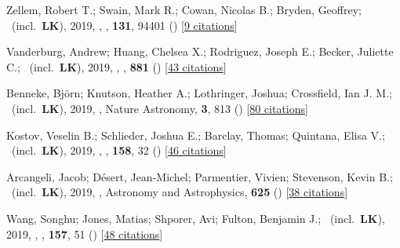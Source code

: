 \item[{\color{numcolor}\scriptsize31}] Zellem, Robert T.; Swain, Mark R.; Cowan, Nicolas B.; Bryden, Geoffrey; \etal\ (incl.\ \textbf{LK}), 2019, , \pasp, \textbf{131}, 94401 () [\href{https://ui.adsabs.harvard.edu/abs/2019PASP..131i4401Z}{9 citations}]

\item[{\color{numcolor}\scriptsize30}] Vanderburg, Andrew; Huang, Chelsea X.; Rodriguez, Joseph E.; Becker, Juliette C.; \etal\ (incl.\ \textbf{LK}), 2019, , \apj, \textbf{881} () [\href{https://ui.adsabs.harvard.edu/abs/2019ApJ...881L..19V}{43 citations}]

\item[{\color{numcolor}\scriptsize29}] Benneke, Bj{\"o}rn; Knutson, Heather A.; Lothringer, Joshua; Crossfield, Ian J. M.; \etal\ (incl.\ \textbf{LK}), 2019, , Nature Astronomy, \textbf{3}, 813 () [\href{https://ui.adsabs.harvard.edu/abs/2019NatAs...3..813B}{80 citations}]

\item[{\color{numcolor}\scriptsize28}] Kostov, Veselin B.; Schlieder, Joshua E.; Barclay, Thomas; Quintana, Elisa V.; \etal\ (incl.\ \textbf{LK}), 2019, , \aj, \textbf{158}, 32 () [\href{https://ui.adsabs.harvard.edu/abs/2019AJ....158...32K}{46 citations}]

\item[{\color{numcolor}\scriptsize27}] Arcangeli, Jacob; D{\'e}sert, Jean-Michel; Parmentier, Vivien; Stevenson, Kevin B.; \etal\ (incl.\ \textbf{LK}), 2019, , Astronomy and Astrophysics, \textbf{625} () [\href{https://ui.adsabs.harvard.edu/abs/2019A&A...625A.136A}{38 citations}]

\item[{\color{numcolor}\scriptsize26}] Wang, Songhu; Jones, Matias; Shporer, Avi; Fulton, Benjamin J.; \etal\ (incl.\ \textbf{LK}), 2019, , \aj, \textbf{157}, 51 () [\href{https://ui.adsabs.harvard.edu/abs/2019AJ....157...51W}{48 citations}]

